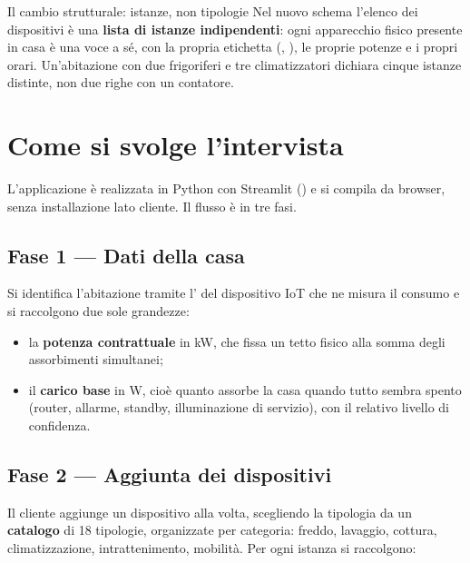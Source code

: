 \begin{notebox}{Il cambio strutturale: istanze, non tipologie}
Nel nuovo schema l'elenco dei dispositivi è una \textbf{lista di istanze indipendenti}: ogni
apparecchio fisico presente in casa è una voce a sé, con la propria etichetta
(, ), le proprie potenze e i propri orari. Un'abitazione con due
frigoriferi e tre climatizzatori dichiara cinque istanze distinte, non due righe con un contatore.
\end{notebox}

\section{Come si svolge l'intervista}

L'applicazione è realizzata in Python con Streamlit () e si compila da
browser, senza installazione lato cliente. Il flusso è in tre fasi.

\subsection*{Fase 1 --- Dati della casa}

Si identifica l'abitazione tramite l' del dispositivo IoT che ne misura il consumo e si
raccolgono due sole grandezze:

\begin{itemize}[nosep,leftmargin=1.4em]
  \item la \textbf{potenza contrattuale} in kW, che fissa un tetto fisico alla somma degli
        assorbimenti simultanei;
  \item il \textbf{carico base} in W, cioè quanto assorbe la casa quando tutto sembra spento
        (router, allarme, standby, illuminazione di servizio), con il relativo livello di
        confidenza.
\end{itemize}


\subsection*{Fase 2 --- Aggiunta dei dispositivi}

Il cliente aggiunge un dispositivo alla volta, scegliendo la tipologia da un \textbf{catalogo}
di 18 tipologie, organizzate per categoria: freddo, lavaggio, cottura, climatizzazione,
intrattenimento, mobilità. Per ogni istanza si raccolgono:

